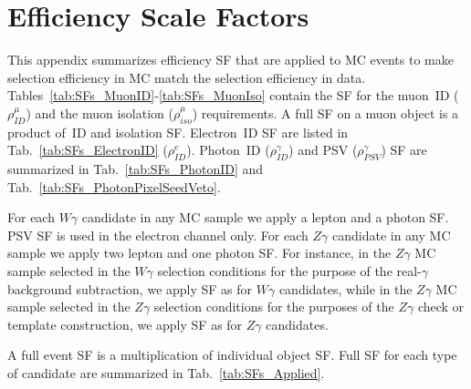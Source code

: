 \chapter{Efficiency Scale Factors}
\label{sec:SFsTables}

This appendix summarizes efficiency SF that are applied to MC events to make selection efficiency in MC match the selection efficiency in data. Tables~\ref{tab:SFs_MuonID}-\ref{tab:SFs_MuonIso} contain the SF for the muon~ID ($\rho^{\mu}_{ID}$) and the muon isolation ($\rho^{\mu}_{iso}$) requirements. A full SF on a muon object is a product of~ID and isolation SF. Electron~ID SF are listed in Tab.~\ref{tab:SFs_ElectronID} ($\rho^{e}_{ID}$). Photon~ID ($\rho^{\gamma}_{ID}$) and PSV ($\rho^{\gamma}_{PSV}$) SF are summarized in Tab.~\ref{tab:SFs_PhotonID} and Tab.~\ref{tab:SFs_PhotonPixelSeedVeto}.

For each $W\gamma$ candidate in any MC sample we apply a lepton and a photon SF. PSV SF is used in the electron channel only. For each $Z\gamma$ candidate in any MC sample we apply two lepton and one photon SF. For instance, in the $Z\gamma$ MC sample selected in the $W\gamma$ selection conditions for the purpose of the real-$\gamma$ background subtraction, we apply SF as for $W\gamma$ candidates, while in the $Z\gamma$ MC sample selected in the $Z\gamma$ selection conditions for the purposes of the $Z\gamma$ check or template construction, we apply SF as for $Z\gamma$ candidates.

A full event SF is a multiplication of individual object SF. Full SF for each type of candidate are summarized in Tab.~\ref{tab:SFs_Applied}.

